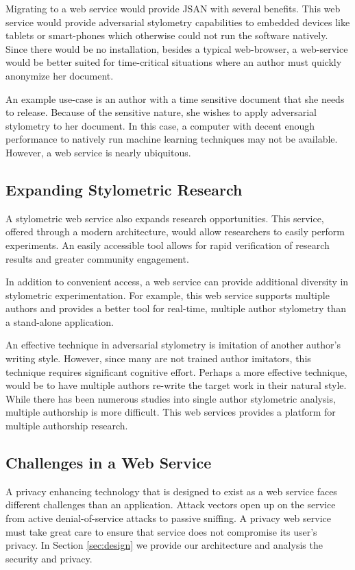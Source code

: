 \documentclass[letterpaper]{article}
\begin{document}
Migrating to a web service would provide JSAN with several benefits.
This web service would provide adversarial stylometry capabilities to
embedded devices like tablets or smart-phones which otherwise could
not run the software natively.  Since there would be no installation,
besides a typical web-browser, a web-service would be better suited
for time-critical situations where an author must quickly anonymize
her document.

An example use-case is an author with a time sensitive document that
she needs to release.  Because of the sensitive nature, she wishes to
apply adversarial stylometry to her document.  In this case, a
computer with decent enough performance to natively run machine
learning techniques may not be available.  However, a web service is
nearly ubiquitous.

\subsection{Expanding Stylometric Research}

A stylometric web service also expands research opportunities.  This
service, offered through a modern architecture, would allow
researchers to easily perform experiments.  An easily accessible tool
allows for rapid verification of research results and greater
community engagement.

In addition to convenient access, a web service can provide additional
diversity in stylometric experimentation.  For example, this web
service supports multiple authors and provides a better tool for
real-time, multiple author stylometry than a stand-alone application.

An effective technique in adversarial stylometry is imitation of
another author's writing style.  However, since many are not trained
author imitators, this technique requires significant cognitive effort.
Perhaps a more effective technique, would be to have multiple authors
re-write the target work in their natural style.  While there has been
numerous studies into single author stylometric analysis, multiple
authorship is more difficult.  This web services provides a platform
for multiple authorship research.

\subsection{Challenges in a Web Service}

A privacy enhancing technology that is designed to exist as a web
service faces different challenges than an application.  Attack
vectors open up on the service from active denial-of-service attacks
to passive sniffing.  A privacy web service must take great care to
ensure that service does not compromise its user's privacy.  In
Section \ref{sec:design} we provide our architecture and analysis the
security and privacy.
\end{document}
